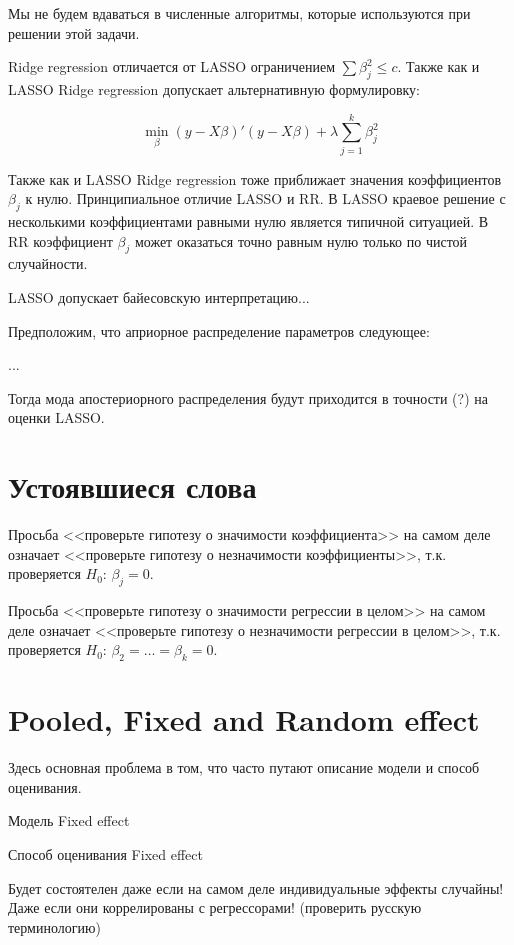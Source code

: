\documentclass[pdftex,12pt,a4paper]{article}
\begin{document}
Мы не будем вдаваться в численные алгоритмы, которые используются при решении этой задачи.


Ridge regression отличается от LASSO ограничением $\sum \beta_j^2\leq c$. 
Также как и LASSO Ridge regression допускает альтернативную формулировку:

\begin{equation}
\min_{\beta} (y-X\beta)'(y-X\beta)+\lambda \sum_{j=1}^{k} \beta_j^2
\end{equation}

Также как и LASSO Ridge regression тоже приближает значения коэффициентов $\beta_j$ к нулю. 
Принципиальное отличие LASSO и RR. 
В LASSO краевое решение с несколькими коэффициентами равными нулю является типичной ситуацией. 
В RR коэффициент $\beta_j$ может оказаться точно равным нулю только по чистой случайности. 


LASSO допускает байесовскую интерпретацию...

Предположим, что априорное распределение параметров следующее:

...


Тогда мода апостериорного распределения будут приходится в точности (?) на оценки LASSO.




\section{Устоявшиеся слова}

Просьба <<проверьте гипотезу о значимости коэффициента>> на самом деле означает <<проверьте гипотезу о незначимости коэффициенты>>, т.к. проверяется $H_0$: $\beta_j=0$.

Просьба <<проверьте гипотезу о значимости регрессии в целом>> на самом деле означает <<проверьте гипотезу о незначимости регрессии в целом>>, т.к. проверяется $H_0$: $\beta_2=\ldots=\beta_k=0$.



\section{Pooled, Fixed and Random effect}

Здесь основная проблема в том, что часто путают описание модели и способ оценивания.


Модель Fixed effect


Способ оценивания Fixed effect

Будет состоятелен даже если на самом деле индивидуальные эффекты случайны! Даже если они коррелированы с регрессорами! (проверить русскую терминологию)
\end{document}
